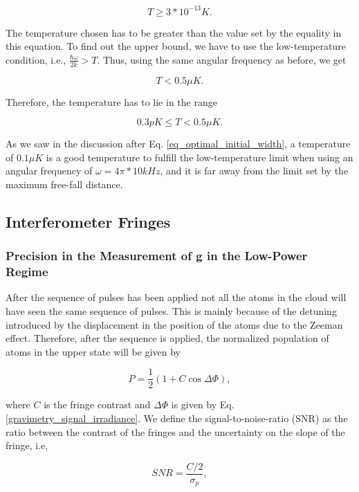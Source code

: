 \documentclass{article}
\begin{document}
\begin{equation}
    T \ge 3*10^{-13} K.
\end{equation}

The temperature chosen has to be greater than the value set by the equality in this equation. To find out the upper bound, we have to use the low-temperature condition, i.e., $\frac{\hbar \omega}{2k} > T$. Thus, using the same angular frequency as before, we get

\begin{equation}
    T < 0.5 \mu K.
\end{equation}

Therefore, the temperature has to lie in the range

\begin{equation}
    0.3 pK \le T < 0.5 \mu K.
\end{equation}

As we saw in the discussion after Eq. \ref{eq_optimal_initial_width}, a temperature of $0.1 \mu K$ is a good temperature to fulfill the low-temperature limit when using an angular frequency of $\omega = 4\pi*10kHz$, and it is far away from the limit set by the maximum free-fall distance.

\subsection{Interferometer Fringes}
\subsubsection{Precision in the Measurement of g in the Low-Power Regime}
After the sequence of pulses has been applied not all the atoms in the cloud will have seen the same sequence of pulses. This is mainly because of the detuning introduced by the displacement in the position of the atoms due to the Zeeman effect. Therefore, after the sequence is applied, the normalized population of atoms in the upper state will be given by

\begin{equation}\label{fringes_equation}
    P = \frac{1}{2}(1+C\cos{\Delta \Phi}),
\end{equation}

where $C$ is the fringe contrast and $\Delta \Phi$ is given by Eq. \ref{gravimetry_signal_irradiance}. We define the signal-to-noise-ratio (SNR) as the ratio between the contrast of the fringes and the uncertainty on the slope of the fringe, i.e,

\begin{equation}
    SNR = \frac{C/2}{\sigma_{p}}, 
\end{equation}
\end{document}
